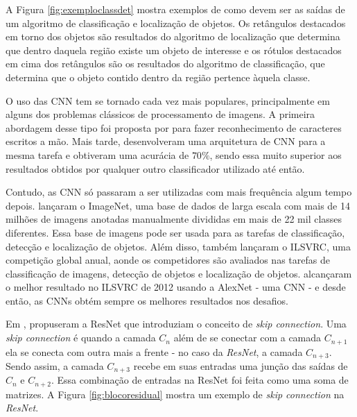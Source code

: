A Figura \ref{fig:exemploclassdet} mostra exemplos de como devem ser as saídas de um algoritmo de classificação e localização de objetos. Os retângulos destacados em torno dos objetos são resultados do algoritmo de localização que determina que dentro daquela região existe um objeto de interesse e os rótulos destacados em cima dos retângulos são os resultados do algoritmo de classificação, que determina que o objeto contido dentro da região pertence àquela classe.

O uso das \ac{CNN} tem se tornado cada vez mais populares, principalmente em alguns dos problemas clássicos de processamento de imagens. A primeira abordagem desse tipo foi proposta por  para fazer reconhecimento de caracteres escritos a mão. Mais tarde,  desenvolveram uma arquitetura de \ac{CNN} para a mesma tarefa e obtiveram uma acurácia de $70\%$, sendo essa muito superior aos resultados obtidos por qualquer outro classificador utilizado até então.

Contudo, as \ac{CNN} só passaram a ser utilizadas com mais frequência algum tempo depois.  lançaram o ImageNet, uma base de dados de larga escala com mais de 14 milhões de imagens anotadas manualmente divididas em mais de 22 mil classes diferentes. Essa base de imagens pode ser usada para as tarefas de classificação, detecção e localização de objetos. Além disso,  também lançaram o \ac{ILSVRC}, uma competição global anual, aonde os competidores são avaliados nas tarefas de classificação de imagens, detecção de objetos e localização de objetos.  alcançaram o melhor resultado no \ac{ILSVRC} de 2012 usando a AlexNet - uma \ac{CNN} - e desde então, as \ac{CNN}s obtém sempre os melhores resultados nos desafios.

Em \citeyear{he-2016}, \citeauthor{he-2016} propuseram a \ac{ResNet} que introduziam o conceito de \textit{skip connection}. Uma \textit{skip connection} é quando a camada $C_n$ além de se conectar com a camada $C_{n+1}$ ela se conecta com outra mais a frente - no caso da \textit{\ac{ResNet}}, a camada $C_{n+3}$. Sendo assim, a camada $C_{n+3}$ recebe em suas entradas uma junção das saídas de $C_{n}$ e $C_{n+2}$. Essa combinação de entradas na \ac{ResNet} foi feita como uma soma de matrizes. A Figura \ref{fig:blocoresidual} mostra um exemplo de \textit{skip connection} na \textit{\ac{ResNet}}.


